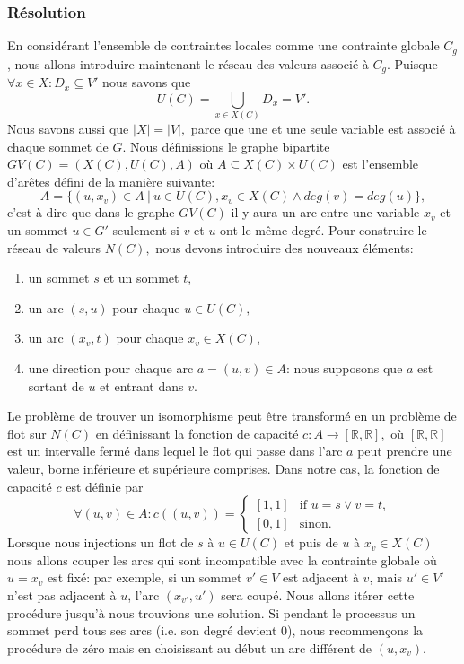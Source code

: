 \documentclass[french]{article}
\theoremstyle{definition}
\theoremstyle{remark}
\begin{document}
\subsubsection{Résolution}
En considérant l'ensemble de contraintes locales comme une contrainte globale $C_g$, nous allons introduire maintenant le réseau des valeurs \cite{regin} associé à $C_g$. Puisque $\forall x \in X: D_x \subseteq V'$ nous savons que
$$U(C)=\bigcup_{x \in X(C)} D_x = V'.$$
Nous savons aussi que $|X|=|V|,$ parce que une et une seule variable est associé à chaque sommet de $G$. Nous définissions le graphe bipartite $GV(C)=(X(C), U(C), A)$ où $A \subseteq X(C) \times U(C)$ est l'ensemble d'arêtes défini de la manière suivante:
$$A=\{(u, x_v) \in A\ |\ u \in U(C), x_v \in X(C) \land deg(v)=deg(u) \},$$
c'est à dire que dans le graphe $GV(C)$ il y aura un arc entre une variable $x_v$ et un sommet $u \in G'$ seulement si $v$ et $u$ ont le même degré. 
Pour construire le réseau de valeurs $N(C),$ nous devons introduire des nouveaux éléments:
\begin{enumerate}
	\item un sommet $s$ et un sommet $t$,
	\item un arc $(s, u)$ pour chaque $u \in U(C),$
	\item un arc $(x_v, t)$ pour chaque $x_v \in X(C),$
	\item une direction pour chaque arc $a=(u,v) \in A$: nous supposons que $a$ est sortant de $u$ et entrant dans $v$.
\end{enumerate}
 Le problème de trouver un isomorphisme peut être transformé en un problème de flot sur $N(C)$ en définissant la fonction de capacité $c: A \rightarrow [\mathbb{R}, \mathbb{R}],$ où  $[\mathbb{R}, \mathbb{R}]$ est un intervalle fermé dans lequel le flot qui passe dans l'arc $a$ peut prendre une valeur, borne inférieure et supérieure comprises. Dans notre cas, la fonction de capacité $c$ est définie par
\[  \forall (u,v) \in A:
c((u,v))= 
\begin{cases}
[1,1]& \text{if } u=s \lor v=t,\\
[0,1]              & \text{sinon}.
\end{cases}
\]
Lorsque nous injections un flot de $s$ à $u \in U(C)$ et puis de $u$ à $x_v \in X(C)$ nous allons couper les arcs qui sont incompatible avec la contrainte globale où $u=x_v$ est fixé: par exemple, si un sommet $v' \in V$ est adjacent à $v$, mais $u' \in V'$ n'est pas adjacent à $u$, l'arc $(x_{v'},u')$ sera coupé. Nous allons itérer cette procédure jusqu'à nous trouvions une solution. Si pendant le processus un sommet perd tous ses arcs (i.e. son degré devient $0$), nous recommençons la procédure de zéro mais en choisissant au début un arc différent de $(u, x_v).$
\end{document}
